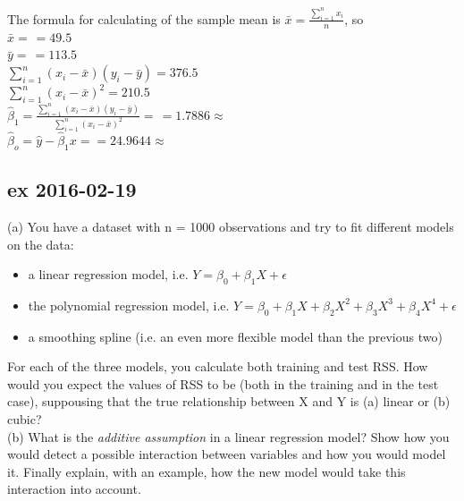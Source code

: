 \documentclass[a4paper,12pt,titlepage]{article} %
\begin{document}
The formula for calculating of the sample mean is $ \bar{x} = \frac{\sum_{i=1}^{n} x_{i}}{n} $, so \\

$\bar{x} = \frac{}{} = 49.5 $ \\

$\bar{y} = \frac{}{} = 113.5 $ \\

$ \sum_{i=1}^{n} (x_{i}-\bar{x}) (y_{i}-\bar{y}) = 376.5 $ \\

$ \sum_{i=1}^{n} (x_{i}-\bar{x})^{2} = 210.5 $ \\

$ \hat{\beta}_{1} = \frac{\sum_{i=1}^{n} (x_{i}-\bar{x}) (y_{i}-\bar{y})}{ \sum_{i=1}^{n} (x_{i}-\bar{x})^{2} } = \frac{}{} = 1.7886 \approx  $ \\

$ \hat{\beta}_{o} = \hat{y} - \hat{\beta}_{1} x =  = 24.9644 \approx  $ \\

\subsection{ex 2016-02-19}
(a) You have a dataset with n = 1000 observations and try to fit different models on the data:
\begin{itemize}
\item a linear regression model, i.e. $ Y = \beta_{0} + \beta_{1} X + \epsilon $
\item the polynomial regression model, i.e. $ Y = \beta_{0} + \beta_{1} X + \beta_{2} X^{2} + \beta_{3} X^{3} + \beta_{4} X^{4} + \epsilon $
\item a smoothing spline (i.e. an even more flexible model than the previous two)
\end{itemize}

For each of the three models, you calculate both training and test RSS. How would you expect the values of RSS to be (both in the training and in the test case), suppousing that the true relationship between X and Y is (a) linear or (b) cubic?\\

(b) What is the \textit{additive assumption} in a linear regression model? Show how you would detect a possible interaction between variables and how you would model it. Finally explain, with an example, how the new model would take this interaction into account.

\newpage
\end{document}
